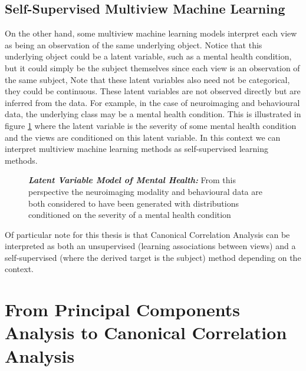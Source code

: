 \subsection{Self-Supervised Multiview Machine Learning}

On the other hand, some multiview machine learning models interpret each view as being an observation of the same underlying object.
Notice that this underlying object could be a latent variable, such as a mental health condition, but it could simply be the subject themselves since each view is an observation of the same subject, Note that these latent variables also need not be categorical, they could be continuous. These latent variables are not observed directly but are inferred from the data. For example, in the case of neuroimaging and behavioural data, the underlying class may be a mental health condition. This is illustrated in figure \ref{fig:mentalhealthselfsupervised} where the latent variable is the severity of some mental health condition and the views are conditioned on this latent variable. In this context we can interpret multiview machine learning methods as self-supervised learning methods.

\begin{figure}
    \centering
    \caption[Latent Variable Model of Mental Health]{\textit{\textbf{Latent Variable Model of Mental Health:}} From this perspective the neuroimaging modality and behavioural data are both considered to have been generated with distributions conditioned on the severity of a mental health condition}\label{fig:mentalhealthselfsupervised}
\end{figure}

Of particular note for this thesis is that Canonical Correlation Analysis can be interpreted as both an unsupervised (learning associations between views) and a self-supervised (where the derived target is the subject) method depending on the context.

\section{From Principal Components Analysis to Canonical Correlation Analysis}

